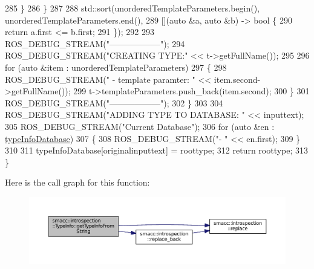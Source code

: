 \begin{DoxyCode}
285             \}
286         \}
287 
288         std::sort(unorderedTemplateParameters.begin(), unorderedTemplateParameters.end(),
289                   [](\textcolor{keyword}{auto} &a, \textcolor{keyword}{auto} &b) -> \textcolor{keywordtype}{bool} \{
290                       \textcolor{keywordflow}{return} a.first <= b.first;
291                   \});
292 
293         ROS\_DEBUG\_STREAM(\textcolor{stringliteral}{"------------------"});
294         ROS\_DEBUG\_STREAM(\textcolor{stringliteral}{"CREATING TYPE:"} << t->getFullName());
295 
296         \textcolor{keywordflow}{for} (\textcolor{keyword}{auto} &item : unorderedTemplateParameters)
297         \{
298             ROS\_DEBUG\_STREAM(\textcolor{stringliteral}{" - template paramter: "} << item.second->getFullName());
299             t->templateParameters.push\_back(item.second);
300         \}
301         ROS\_DEBUG\_STREAM(\textcolor{stringliteral}{"------------------"});
302     \}
303 
304     ROS\_DEBUG\_STREAM(\textcolor{stringliteral}{"ADDING TYPE TO DATABASE: "} << inputtext);
305     ROS\_DEBUG\_STREAM(\textcolor{stringliteral}{"Current Database"});
306     \textcolor{keywordflow}{for} (\textcolor{keyword}{auto} &en : \hyperlink{classsmacc_1_1introspection_1_1TypeInfo_ab780c03206b824aaf338135d16b0eff4}{typeInfoDatabase})
307     \{
308         ROS\_DEBUG\_STREAM(\textcolor{stringliteral}{"- "} << en.first);
309     \}
310 
311     typeInfoDatabase[originalinputtext] = roottype;
312     \textcolor{keywordflow}{return} roottype;
313 \}
\end{DoxyCode}


Here is the call graph for this function\+:
\nopagebreak
\begin{figure}[H]
\begin{center}
\leavevmode
\includegraphics[width=350pt]{classsmacc_1_1introspection_1_1TypeInfo_a47d65b6c61499d7ae8ab9f6325c84837_cgraph}
\end{center}
\end{figure}




